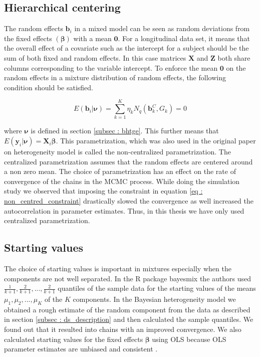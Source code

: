 \subsection{Hierarchical centering}
The random effects $\boldsymbol{b}_i$ in a mixed model can be seen as random deviations from the fixed effects $(\boldsymbol{\beta})$ with a mean $\boldsymbol{0}$. For a longitudinal data set, it means that the overall effect of a covariate such as the intercept for a subject should be the sum of both fixed and random effects. In this case matrices $\boldsymbol{X}$ and $\boldsymbol{Z}$ both share columns corresponding to the variable intercept. To enforce the mean $\boldsymbol{0}$ on the random effects in a mixture distribution of random effects, the following condition should be satisfied.

\begin{equation}
\label{eq : non_centred_constraint}
E(\boldsymbol{b}_i | \boldsymbol{\nu}) = \sum_{k=1}^{K} \eta_k N_q(\boldsymbol{b}_k^C, G_k) = 0
\end{equation}

where $\boldsymbol{\nu}$ is defined in section \ref{subsec : bhtge}. This further means that $E(\boldsymbol{y}_i | \boldsymbol{\nu}) = \boldsymbol{X}_{i}\boldsymbol{\beta}$. This parametrization, which was also used in the original paper on heterogeneity model \citep{verbeke_linear_1996} is called the non-centralized parametrization. The centralized parametrization assumes that the random effects are centered around a non zero mean. The choice of parametrization has an effect on the rate of convergence of the chains in the MCMC process. While doing the simulation study we observed that imposing the constraint in equation \ref{eq : non_centred_constraint} drastically slowed the convergence as well increased the autocorrelation in parameter estimates. Thus, in this thesis we have only used centralized parametrization.

\subsection{Starting values}
\label{subsec : choice_starting_values}
The choice of starting values is important in mixtures especially when the components are not well separated. In the R package bayesmix \citep{gruen_bayesmix:_2015} the authors used $\frac 1 {k+1}, \frac 2 {k+1}, ..., \frac 2 {k+1}$ quantiles of the sample data for the starting values of the means $\mu_1, \mu_2, ..., \mu_K$ of the $K$ components. In the Bayesian heterogeneity model we obtained a rough estimate of the random component from the data as described in section \ref{subsec : ds_description} and then calculated the sample quantiles. We found out that it resulted into chains with an improved convergence. We also calculated starting values for the fixed effects $\boldsymbol{\beta}$ using OLS because OLS parameter estimates are unbiased and consistent \citep[pg. 50]{verbeke_linear_2009}.

